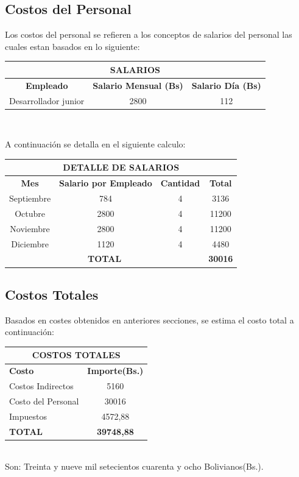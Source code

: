 \documentclass[11pt,letterpaper]{report}
\begin{document}
\subsection{Costos del Personal}
Los costos del personal se refieren a los conceptos de salarios del personal las cuales estan basados en lo siguiente:\\
\begin{center}
	\begin{tabular}{|c|c|c|}
		\hline
		\multicolumn{3}{|c|}{\textbf{SALARIOS}}\\ \hline
		\textbf{Empleado} & \textbf{Salario Mensual (Bs)}	& \textbf{Salario Día (Bs)} \\ \hline
		Desarrollador junior & 2800 & 112 \\ \hline
	\end{tabular} \\ 
\end{center} 
A continuación se detalla en el siguiente calculo:\\
\begin{center}
	\begin{tabular}{|c|c|c|c|}
		\hline
		\multicolumn{4}{|c|}{\textbf{DETALLE DE SALARIOS}} \\ \hline
		\textbf{Mes} & \textbf{Salario por Empleado} & \textbf{Cantidad} & \textbf{Total} \\ \hline
		Septiembre	& 784	& 4	& 3136 \\ \hline
		Octubre	& 2800	& 4	& 11200 \\ \hline
		Noviembre	& 2800	& 4	& 11200 \\ \hline
		Diciembre	& 1120	& 4	& 4480 \\ \hline
		\multicolumn{3}{|c|}{\textbf{TOTAL}} & \textbf{30016} \\ \hline
	\end{tabular}
\end{center}
\subsection{Costos Totales}
Basados en costes obtenidos en anteriores secciones, se estima el costo total a continuación: \\
\begin{center}
	\begin{tabular}{|l|c|}
		\hline
		\multicolumn{2}{|c|}{\textbf{COSTOS TOTALES}} \\ \hline
		\textbf{Costo} 	& \textbf{Importe(Bs.)}\\ \hline
		Costos Indirectos	& 5160 \\ \hline
		Costo del Personal	& 30016 \\ \hline
		Impuestos	& 4572,88 \\ \hline
		\textbf{TOTAL} & \textbf{39748,88} \\ \hline
	\end{tabular} \\
	Son: Treinta y nueve mil setecientos cuarenta y ocho Bolivianos(Bs.). \\
\end{center}
\end{document}
